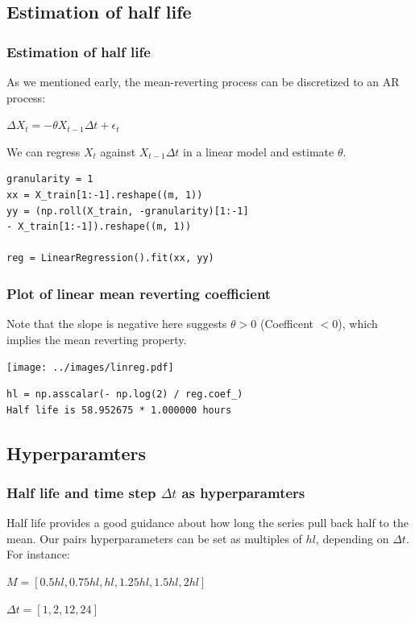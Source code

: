 \documentclass[11pt]{beamer}
\begin{document}
\subsection*{Estimation of half life}
\begin{frame}[fragile]
\frametitle{Estimation of half life}
As we mentioned early, the mean-reverting process can be discretized to an AR process:

\begin{center}
	$\Delta X_t = -\theta X_{t-1} \Delta t +\epsilon_t$
\end{center}
 We can regress $X_t$ against $X_{t-1}\Delta t$ in a linear model and estimate $\theta$.
\begin{verbatim}
granularity = 1
xx = X_train[1:-1].reshape((m, 1)) 
yy = (np.roll(X_train, -granularity)[1:-1] 
- X_train[1:-1]).reshape((m, 1)) 

reg = LinearRegression().fit(xx, yy)
\end{verbatim}
\end{frame}

\begin{frame}[fragile]
\frametitle{Plot of linear mean reverting coefficient}
Note that the slope is negative here suggests $\theta > 0$ (Coefficent $<0$), which implies the mean reverting property.
\begin{center}
	\noindent\texttt{[image: ../images/linreg.pdf]}
\end{center}

\begin{verbatim}
hl = np.asscalar(- np.log(2) / reg.coef_)
Half life is 58.952675 * 1.000000 hours
\end{verbatim}

\end{frame}

\subsection*{Hyperparamters}
\begin{frame}
\frametitle{Half life and time step $\Delta t$ as hyperparamters}
Half life provides a good guidance about how long the series pull back half to the mean. Our pairs hyperparameters  can be set as multiples of $hl$, depending on $\Delta t$. For instance:
\begin{center}
	$M = [0.5hl, 0.75hl, hl, 1.25hl, 1.5hl, 2hl]$
	
	$\Delta t = [1, 2, 12, 24]$
\end{center}
\end{frame}
\end{document}
